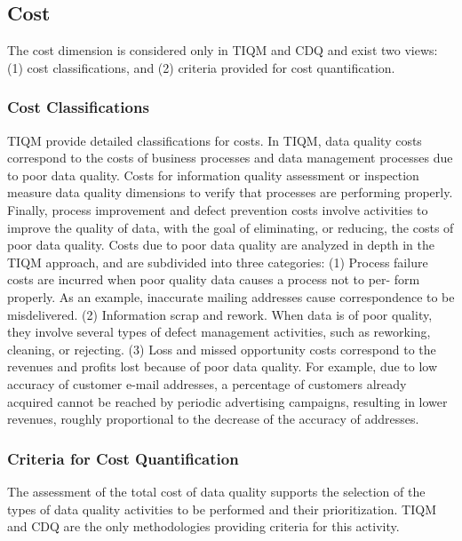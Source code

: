 \documentclass[pdftex,english,oribibl]{llncs}
\begin{document}
\subsection{Cost}
The cost dimension is considered only in TIQM and CDQ and exist two views: (1) cost classifications, and (2) criteria provided for cost quantification.

\subsubsection{Cost Classifications}
TIQM provide detailed classifications for costs.
In TIQM, data quality costs correspond to the costs of business processes and data management processes due to poor data quality. Costs for information quality assessment or inspection measure data quality dimensions to verify that processes are performing properly. Finally, process improvement and defect prevention costs involve activities to improve the quality of data, with the goal of eliminating, or reducing, the costs of poor data quality. Costs due to poor data quality are analyzed in depth in the TIQM approach, and are subdivided into three categories:
(1) Process failure costs are incurred when poor quality data causes a process not to per- form properly. As an example, inaccurate mailing addresses cause correspondence to be misdelivered.
(2) Information scrap and rework. When data is of poor quality, they involve several types of defect management activities, such as reworking, cleaning, or rejecting.
(3) Loss and missed opportunity costs correspond to the revenues and profits lost because of poor data quality. For example, due to low accuracy of customer e-mail addresses, a percentage of customers already acquired cannot be reached by periodic advertising campaigns, resulting in lower revenues, roughly proportional to the decrease of the accuracy of addresses.

\subsubsection{Criteria for Cost Quantification}
The assessment of the total cost of data quality supports the selection of the types of data quality activities to be performed and their prioritization. TIQM and CDQ are the only methodologies providing criteria for this activity.
\end{document}
